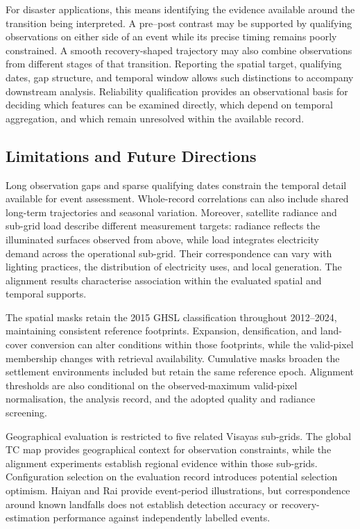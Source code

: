 \documentclass[]{interact}
\theoremstyle{plain}%
\theoremstyle{definition}
\theoremstyle{remark}
\begin{document}
        For disaster applications, this means identifying the evidence available around the transition being interpreted. A pre--post contrast may be supported by qualifying observations on either side of an event while its precise timing remains poorly constrained. A smooth recovery-shaped trajectory may also combine observations from different stages of that transition. Reporting the spatial target, qualifying dates, gap structure, and temporal window allows such distinctions to accompany downstream analysis. Reliability qualification provides an observational basis for deciding which features can be examined directly, which depend on temporal aggregation, and which remain unresolved within the available record.
        
    \subsection{Limitations and Future Directions}
    
        Long observation gaps and sparse qualifying dates constrain the temporal detail available for event assessment. Whole-record correlations can also include shared long-term trajectories and seasonal variation. Moreover, satellite radiance and sub-grid load describe different measurement targets: radiance reflects the illuminated surfaces observed from above, while load integrates electricity demand across the operational sub-grid. Their correspondence can vary with lighting practices, the distribution of electricity uses, and local generation. The alignment results characterise association within the evaluated spatial and temporal supports.
        
        The spatial masks retain the 2015 GHSL classification throughout 2012--2024, maintaining consistent reference footprints. Expansion, densification, and land-cover conversion can alter conditions within those footprints, while the valid-pixel membership changes with retrieval availability. Cumulative masks broaden the settlement environments included but retain the same reference epoch. Alignment thresholds are also conditional on the observed-maximum valid-pixel normalisation, the analysis record, and the adopted quality and radiance screening.
        
        Geographical evaluation is restricted to five related Visayas sub-grids. The global TC map provides geographical context for observation constraints, while the alignment experiments establish regional evidence within those sub-grids. Configuration selection on the evaluation record introduces potential selection optimism. Haiyan and Rai provide event-period illustrations, but correspondence around known landfalls does not establish detection accuracy or recovery-estimation performance against independently labelled events.
        
\end{document}
